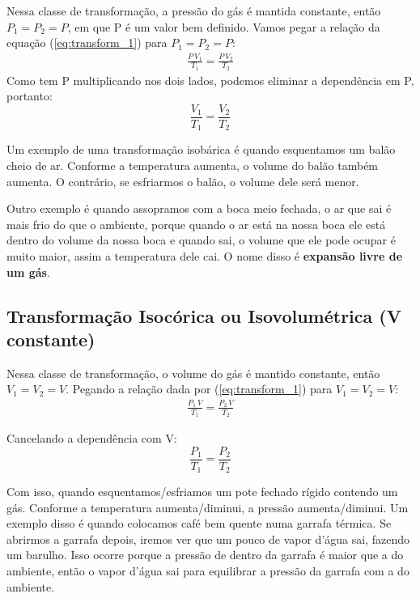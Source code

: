 \documentclass[12pt]{extarticle}
\newcommand{\<}{\langle}
\renewcommand{\>}{\rangle}
\theoremstyle{definition}
\begin{document}
Nessa classe de transformação, a pressão do gás é mantida constante, então $P_1 = P_2 = P$, em que P é um valor bem definido. Vamos pegar a relação da equação (\ref{eq:transform_1}) para $P_1 = P_2 = P$:
\begin{align*}
    \frac{P\,V_1}{T_1} = \frac{P\,V_2}{T_2}
\end{align*}
Como tem P multiplicando nos dois lados, podemos eliminar a dependência em P, portanto:
\begin{equation}
    \frac{V_1}{T_1} = \frac{V_2}{T_2}
\end{equation}

Um exemplo de uma transformação isobárica é quando esquentamos um balão cheio de ar. Conforme a temperatura aumenta, o volume do balão também aumenta. O contrário, se esfriarmos o balão, o volume dele será menor. 

Outro exemplo é quando assopramos com a boca meio fechada, o ar que sai é mais frio do que o ambiente, porque quando o ar está na nossa boca ele está dentro do volume da nossa boca e quando sai, o volume que ele pode ocupar é muito maior, assim a temperatura dele cai. O nome disso é \textbf{expansão livre de um gás}.

\subsection{Transformação Isocórica ou Isovolumétrica (V constante)}

Nessa classe de transformação, o volume do gás é mantido constante, então $V_1=V_2=V$. Pegando a relação dada por (\ref{eq:transform_1}) para  $V_1=V_2=V$:
\begin{align*}
    \frac{P_1\,V}{T_1} = \frac{P_2\,V}{T_2}
\end{align*}

Cancelando a dependência com V:
\begin{equation}
    \frac{P_1}{T_1} = \frac{P_2}{T_2}
\end{equation}

Com isso, quando esquentamos/esfriamos um pote fechado rígido contendo um gás. Conforme a temperatura aumenta/diminui, a pressão aumenta/diminui. Um exemplo disso é quando colocamos café bem quente numa garrafa térmica. Se abrirmos a garrafa depois, iremos ver que um pouco de vapor d'água sai, fazendo um barulho. Isso ocorre porque a pressão de dentro da garrafa é maior que a do ambiente, então o vapor d'água sai para equilibrar a pressão da garrafa com a do ambiente.
\end{document}
